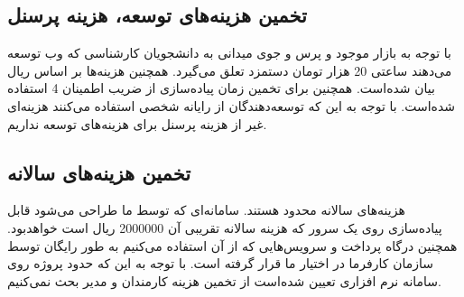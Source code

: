 \subsection* {تخمین هزینه‌های توسعه، هزینه پرسنل}
با توجه به بازار موجود و پرس و جوی میدانی به دانشجویان کارشناسی که وب توسعه می‌دهند ساعتی 20 هزار تومان دستمزد تعلق می‌گیرد. همچنین هزینه‌ها بر اساس ریال بیان شده‌است. همچنین برای تخمین زمان پیاده‌سازی از ضریب اطمینان 4 استفاده شده‌است. با توجه به این که توسعه‌دهندگان از رایانه شخصی استفاده می‌کنند هزینه‌ای غیر از هزینه پرسنل برای هزینه‌های توسعه نداریم. 
\begin{table}[h!]
\centering
{}
\end{table}
\subsection* {تخمین هزینه‌های سالانه}
هزینه‌های سالانه محدود هستند. سامانه‌ای که توسط ما طراحی می‌شود قابل پیاده‌سازی روی یک سرور که هزینه سالانه تقریبی آن 2000000 ریال است خواهدبود. همچنین درگاه پرداخت و سرویس‌هایی که از آن استفاده می‌کنیم به طور رایگان توسط سازمان کارفرما در اختیار ما قرار گرفته است. با توجه به این که حدود پروژه روی سامانه نرم افزاری تعیین شده‌است از تخمین هزینه کارمندان و مدیر بحث نمی‌کنیم.